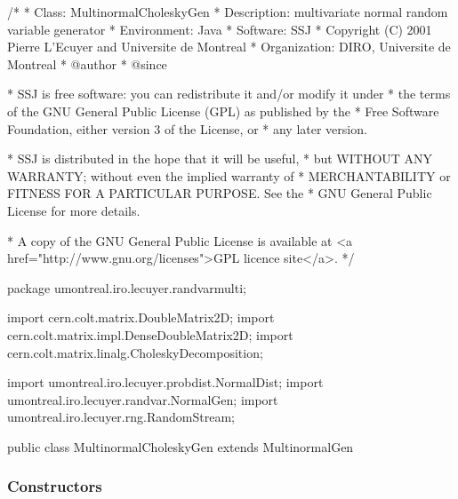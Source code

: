 \begin{code}
\begin{hide}
/*
 * Class:        MultinormalCholeskyGen
 * Description:  multivariate normal random variable generator
 * Environment:  Java
 * Software:     SSJ 
 * Copyright (C) 2001  Pierre L'Ecuyer and Universite de Montreal
 * Organization: DIRO, Universite de Montreal
 * @author       
 * @since

 * SSJ is free software: you can redistribute it and/or modify it under
 * the terms of the GNU General Public License (GPL) as published by the
 * Free Software Foundation, either version 3 of the License, or
 * any later version.

 * SSJ is distributed in the hope that it will be useful,
 * but WITHOUT ANY WARRANTY; without even the implied warranty of
 * MERCHANTABILITY or FITNESS FOR A PARTICULAR PURPOSE.  See the
 * GNU General Public License for more details.

 * A copy of the GNU General Public License is available at
   <a href="http://www.gnu.org/licenses">GPL licence site</a>.
 */
\end{hide}
package umontreal.iro.lecuyer.randvarmulti;

   import cern.colt.matrix.DoubleMatrix2D;
   import cern.colt.matrix.impl.DenseDoubleMatrix2D;
   import cern.colt.matrix.linalg.CholeskyDecomposition;
\begin{hide}
import umontreal.iro.lecuyer.probdist.NormalDist;
import umontreal.iro.lecuyer.randvar.NormalGen;
import umontreal.iro.lecuyer.rng.RandomStream;
\end{hide}

public class MultinormalCholeskyGen extends MultinormalGen\begin{hide} {

   private void initL() {
      if (mu.length != sigma.rows() || mu.length != sigma.columns())
         throw new IllegalArgumentException
            ("Incompatible mean vector and covariance matrix");
      CholeskyDecomposition decomp = new CholeskyDecomposition (sigma);
      //if (!decomp.isSymmetricPositiveDefinite())
      //   throw new IllegalArgumentException
      //      ("The covariance matrix must be symmetric and positive-definite");
      sqrtSigma = decomp.getL();
   }\end{hide}
\end{code}

\subsubsection*{Constructors}

